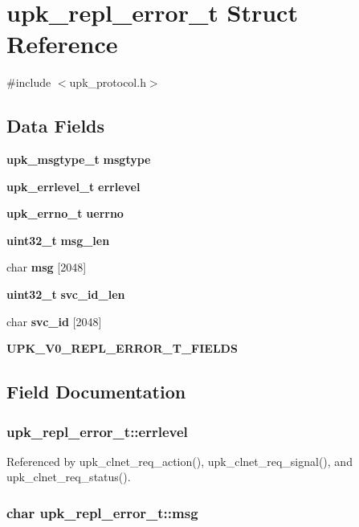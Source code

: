 \section{upk\_\-repl\_\-error\_\-t Struct Reference}
\label{structupk__repl__error__t}


{\ttfamily \#include $<$upk\_\-protocol.h$>$}

\subsection*{Data Fields}
\begin{DoxyCompactItemize}
\item 
{\bf upk\_\-msgtype\_\-t} {\bf msgtype}
\item 
{\bf upk\_\-errlevel\_\-t} {\bf errlevel}
\item 
{\bf upk\_\-errno\_\-t} {\bf uerrno}
\item 
{\bf uint32\_\-t} {\bf msg\_\-len}
\item 
char {\bf msg} [2048]
\item 
{\bf uint32\_\-t} {\bf svc\_\-id\_\-len}
\item 
char {\bf svc\_\-id} [2048]
\item 
{\bf UPK\_\-V0\_\-REPL\_\-ERROR\_\-T\_\-FIELDS}
\end{DoxyCompactItemize}


\subsection{Field Documentation}
\subsubsection[{errlevel}]{ {\bf upk\_\-repl\_\-error\_\-t::errlevel}}\label{structupk__repl__error__t_a41c6aa23e6ec4a2876a135dafd8e6bf6}


Referenced by upk\_\-clnet\_\-req\_\-action(), upk\_\-clnet\_\-req\_\-signal(), and upk\_\-clnet\_\-req\_\-status().

\subsubsection[{msg}]{\setlength{\rightskip}{0pt plus 5cm}char {\bf upk\_\-repl\_\-error\_\-t::msg}}\label{structupk__repl__error__t_ab2fc12142482069736512c839f1c80ef}


